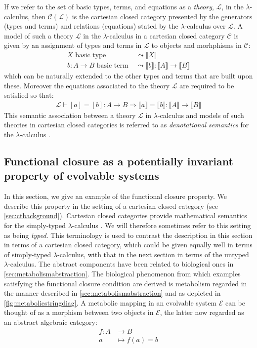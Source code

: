 \documentclass[10pt]{article}
\theoremstyle{plain}
\theoremstyle{definition}
\theoremstyle{remark}
\begin{document}
If we refer to the set of basic types, terms, and equations as a \emph{theory}, $\mathcal{L}$, in the $\lambda$-calculus, then $\mathcal{C}(\mathcal{L})$ is the cartesian closed category presented by the generators (types and terms) and relations (equations) stated by the $\lambda$-calculus over $\mathcal{L}$. A model of such a theory $\mathcal{L}$ in the $\lambda$-calculus in a cartesian closed category $\mathcal{C}$ is given by an assignment of types and terms in $\mathcal{L}$ to objects and morhphisms in $\mathcal{C}$:
\begin{align*}
X \mbox{ basic type } &\leadsto \llbracket X \rrbracket\\
b \colon A \rightarrow B \mbox{ basic term } &\leadsto \llbracket b \rrbracket \colon \llbracket A \rrbracket \rightarrow \llbracket B \rrbracket
\end{align*}
which can be naturally extended to the other types and terms that are built upon these. Moreover the equations associated to the theory $\mathcal{L}$ are required to be satisfied so that:
\begin{align*}
\mathcal{L} \vdash [a]=[b] \colon A \rightarrow B \Longrightarrow \llbracket a \rrbracket = \llbracket b \rrbracket \colon \llbracket A \rrbracket \rightarrow \llbracket B \rrbracket
\end{align*}
This semantic association between a theory $\mathcal{L}$ in $\lambda$-calculus and models of such theories in cartesian closed categories is referred to as \emph{denotational semantics} for the $\lambda$-calculus \cite{Britain1980,Scott1980,Scott2000,J.Lambek177,Awodey2000,Awodey2006}.

\subsection{Functional closure as a potentially invariant property of evolvable systems}\label{sec:funclosinvarevo}

In this section, we give an example of the functional closure property. We describe this property in the setting of a cartesian closed category (see \ref{sec:ctbackground}). Cartesian closed categories provide mathematical semantics for the simply-typed $\lambda$-calculus \cite{Barendregt1985}. We will therefore sometimes refer to this setting as being \emph{typed}. This terminology is used to contrast the description in this section in terms of a cartesian closed category, which could be given equally well in terms of simply-typed $\lambda$-calculus, with that in the next section in terms of the untyped $\lambda$-calculus. The abstract components have been related to biological ones in \ref{sec:metabolismabstraction}. The biological phenomenon from which examples satisfying the functional closure condition are derived is metabolism regarded in the manner described in \ref{sec:metabolismabstraction} and as depicted in \ref{fig:metabolicstringdiag}. A metabolic mapping in an evolvable system $\mathcal{E}$ can be thought of as a morphism between two objects in $\mathcal{E}$, the latter now regarded as an abstract algebraic category:
\begin{align*}
f \colon A &\longrightarrow B\\
a &\longmapsto f(a)=b
\end{align*}
\end{document}
